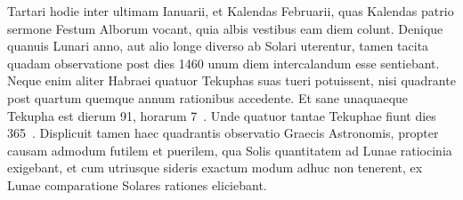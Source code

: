 Tartari hodie inter ultimam Ianuarii,
et Kalendas Februarii, quas Kalendas patrio sermone Festum Alborum
vocant, quia albis vestibus eam diem colunt.
Denique quanuis
Lunari anno, aut alio longe diverso ab Solari uterentur, tamen tacita
quadam observatione post dies 1460 unum diem intercalandum esse
sentiebant.
Neque enim aliter Habraei quatuor Tekuphas suas tueri
potuissent, nisi quadrante post quartum quemque annum rationibus accedente.
Et sane unaquaeque Tekupha est dierum 91, horarum 7~.
Unde
quatuor tantae Tekuphae fiunt dies 365~.
Displicuit tamen haec quadrantis
observatio Graecis Astronomis, propter causam admodum futilem
et puerilem, qua Solis quantitatem ad Lunae ratiocinia exigebant,
et cum utriusque sideris exactum modum adhuc non tenerent,
ex Lunae comparatione Solares rationes eliciebant.

